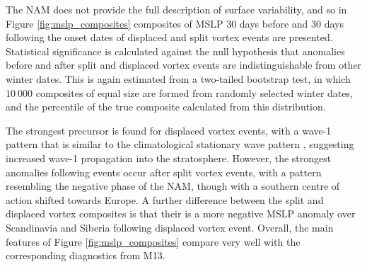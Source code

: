The NAM does not provide the full description of surface variability, and so in
Figure \ref{fig:mslp_composites} composites of MSLP 30 days before and 30 days
following the onset dates of displaced and split vortex events are
presented. Statistical significance is calculated against the null hypothesis
that anomalies before and after split and displaced vortex events are
indistinguishable from other winter dates. This is again estimated from a
two-tailed bootstrap test, in which $10~000$ composites of equal size are formed
from randomly selected winter dates, and the percentile of the true composite
calculated from this distribution. 

The strongest precursor is found for displaced vortex events, with a wave-1
pattern that is similar to the climatological stationary wave pattern
\citep[e.g.][]{Garfinkel2008}, suggesting increased wave-1 propagation into the
stratosphere. However, the strongest anomalies following events occur after
split vortex events, with a pattern resembling the negative phase of the NAM,
though with a southern centre of action shifted towards Europe. A further
difference between the split and displaced vortex composites is that their is a
more negative MSLP anomaly over Scandinavia and Siberia following displaced
vortex event. Overall, the main features of Figure \ref{fig:mslp_composites}
compare very well with the corresponding diagnostics from M13.

